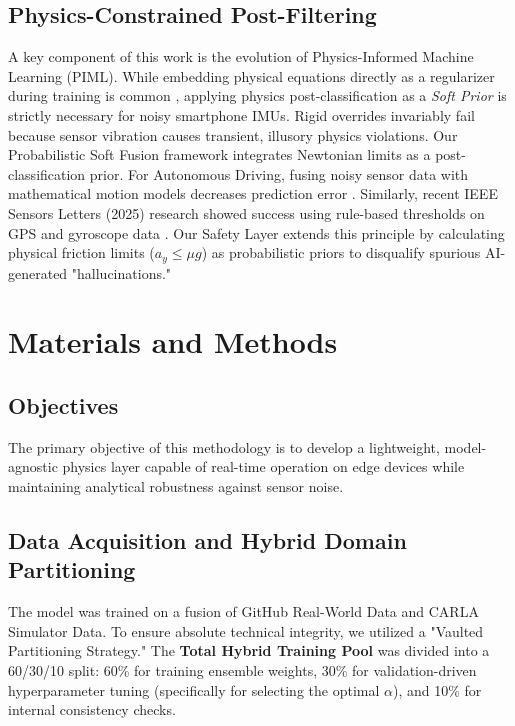 \documentclass[pdflatex,sn-mathphys-num]{sn-jnl}
\theoremstyle{thmstyleone}
\theoremstyle{thmstyletwo}
\theoremstyle{thmstylethree}
\begin{document}
\FloatBarrier
\subsection{Physics-Constrained Post-Filtering}
A key component of this work is the evolution of Physics-Informed Machine Learning (PIML). While embedding physical equations directly as a regularizer during training is common \cite{karnakov2024}, applying physics post-classification as a \textit{Soft Prior} is strictly necessary for noisy smartphone IMUs. Rigid overrides invariably fail because sensor vibration causes transient, illusory physics violations. Our Probabilistic Soft Fusion framework integrates Newtonian limits as a post-classification prior. For Autonomous Driving, fusing noisy sensor data with mathematical motion models decreases prediction error \cite{karnakov2024}.
 Similarly, recent IEEE Sensors Letters (2025) research showed success using rule-based thresholds on GPS and gyroscope data \cite{sensorsletters2025}. Our Safety Layer extends this principle by calculating physical friction limits ($a_y \le \mu g$) as probabilistic priors to disqualify spurious AI-generated "hallucinations."

\FloatBarrier
\section{Materials and Methods}\label{sec:methodology}

\FloatBarrier
\subsection{Objectives}
The primary objective of this methodology is to develop a lightweight, model-agnostic physics layer capable of real-time operation on edge devices while maintaining analytical robustness against sensor noise.

\FloatBarrier
\subsection{Data Acquisition and Hybrid Domain Partitioning}
The model was trained on a fusion of GitHub Real-World Data and CARLA Simulator Data. To ensure absolute technical integrity, we utilized a "Vaulted Partitioning Strategy." The \textbf{Total Hybrid Training Pool} was divided into a 60/30/10 split: 60\% for training ensemble weights, 30\% for validation-driven hyperparameter tuning (specifically for selecting the optimal $\alpha$), and 10\% for internal consistency checks. 
\end{document}
